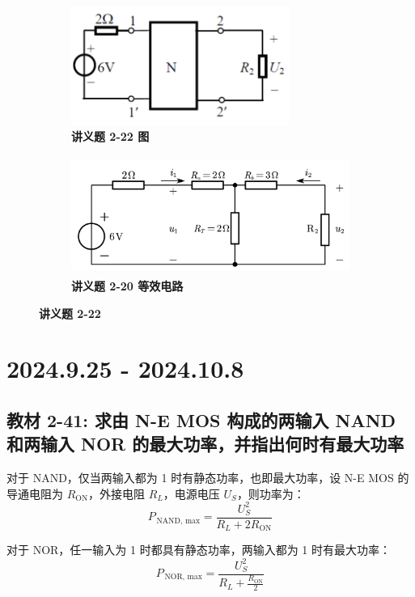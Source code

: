 \documentclass[UTF8]{report}
\theoremstyle{MyLineTheoremStyle} %
\theoremstyle{MyBlockTheoremStyle} %
\theoremstyle{MySubsubsectionStyle} %
\begin{document}
\begin{figure}[H]\centering
\begin{subfigure}[t]{0.4\columnwidth}\centering
    \includegraphics[height=110pt]{assets/4/199279d29390a5449f7ef5c5dc7f8a3d.png}
    \caption{\bfseries 讲义题 2-22 图 }
\end{subfigure}\begin{subfigure}[t]{0.6\columnwidth}\centering
    \includegraphics[height=110pt]{assets/4/2-22.pdf}
    \caption{\bfseries 讲义题 2-20 等效电路 }
\end{subfigure}
\caption{\bfseries 讲义题 2-22 }
\end{figure}

\chapter{2024.9.25 - 2024.10.8}\thispagestyle{fancy}

\section{教材 2-41: 求由 N-E MOS 构成的两输入 NAND 和两输入 NOR 的最大功率，并指出何时有最大功率}

对于 NAND，仅当两输入都为 1 时有静态功率，也即最大功率，设 N-E MOS 的导通电阻为 $R_{\text{ON}}$，外接电阻 $R_L$，电源电压 $U_S$，则功率为：
\begin{equation}
    P_{\,\text{NAND, max}} = \frac{U_S^2}{R_L + 2R_{\text{ON}}}
\end{equation}

对于 NOR，任一输入为 1 时都具有静态功率，两输入都为 1 时有最大功率：
\begin{equation}
    P_{\,\text{NOR, max}} = \frac{U_S^2}{R_L + \frac{R_{\text{ON}}}{2}}
\end{equation}
\end{document}
